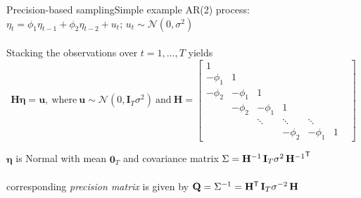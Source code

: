 \documentclass[xcolor=svgnames, 10pt, aspectratio=169]{beamer}
\newcommand\transpose[1]{{#1}^{\sf{T}}}
\begin{document}
\begin{frame}{Precision-based sampling}{Simple example}
AR(2) process: $\eta_t = \phi_1 \eta_{t-1} + \phi_2 \eta_{t-2} + u_t; \, u_t \sim \mathcal{N}(0, \sigma^2)$ \\~\\

Stacking the observations over $t = 1, \dots, T$ yields 
$$
\mathbf{H} \boldsymbol{\eta} = \mathbf{u}, \: \text{where} \: \mathbf{u} \sim \mathcal{N}(0, \mathbf{I}_T \sigma^2) \: \text{and} \:
\mathbf{H} = 
\left[
\begin{smallmatrix}
1 &  &  &  &  \\
-\phi_1 & 1 &  &  &  \\
-\phi_2 & -\phi_1 & 1 &  &  \\
 & -\phi_2 & -\phi_1 & 1 &  &  \\
 &  & \ddots & \ddots & \ddots &  & \\
 &  &  &  -\phi_2 & -\phi_1 & 1
\end{smallmatrix}
\right]
$$ \medskip


$\boldsymbol{\eta}$ is Normal with mean $\mathbf{0}_T$ and covariance matrix $\Sigma = \mathbf{H}^{-1} \, \mathbf{I}_T\sigma^{2} \, \transpose{\mathbf{H}^{-1}}$ \\~\\

corresponding \textit{precision matrix} is given by $\mathbf{Q} = \Sigma^{-1} = \transpose{\mathbf{H}} \, \mathbf{I}_T\sigma^{-2} \, \mathbf{H}$
\end{frame}
\end{document}
